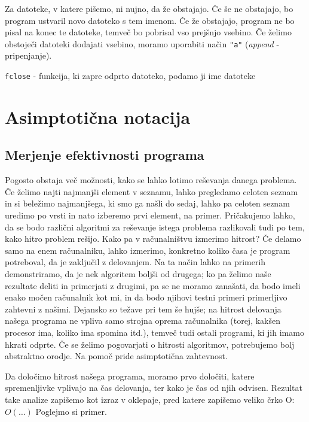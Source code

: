 \documentclass{book}
\begin{document}
Za datoteke, v katere pišemo, ni nujno, da že obstajajo. Če še ne obstajajo, bo
program ustvaril novo datoteko s tem imenom. Če že obstajajo, program ne bo
pisal na konec te datoteke, temveč bo pobrisal vso prejšnjo vsebino.
Če želimo obstoječi datoteki dodajati vsebino, moramo uporabiti način
\verb+"a"+ (\emph{append} - pripenjanje).

\verb+fclose+ - funkcija, ki zapre odprto datoteko, podamo ji ime datoteke

\chapter{Asimptotična notacija}

\section{Merjenje efektivnosti programa}

Pogosto obstaja več možnosti, kako se lahko lotimo reševanja danega problema.
Če želimo najti najmanjši element v seznamu, lahko pregledamo celoten seznam in
si beležimo najmanjšega, ki smo ga našli do sedaj, lahko pa celoten seznam
uredimo po vrsti in nato izberemo prvi element, na primer.
Pričakujemo lahko, da se bodo različni algoritmi za reševanje istega problema
razlikovali tudi po tem, kako hitro problem rešijo.
Kako pa v računalništvu izmerimo hitrost? Če delamo samo na enem računalniku,
lahko izmerimo, konkretno koliko časa je program potreboval, da je zaključil
z delovanjem. Na ta način lahko na primerih demonstriramo, da je nek algoritem
boljši od drugega; ko pa želimo naše rezultate deliti in primerjati z drugimi,
pa se ne moramo zanašati, da bodo imeli enako močen računalnik kot mi, in da
bodo njihovi testni primeri primerljivo zahtevni z našimi. Dejansko so težave
pri tem še hujše; na hitrost delovanja našega programa ne vpliva samo strojna
oprema računalnika (torej, kakšen procesor ima, koliko ima spomina itd.), temveč
tudi ostali programi, ki jih imamo hkrati odprte.
Če se želimo pogovarjati o hitrosti algoritmov, potrebujemo bolj abstraktno
orodje. Na pomoč pride asimptotična zahtevnost.

Da določimo hitrost našega programa, moramo prvo določiti, katere spremenljivke
vplivajo na čas delovanja, ter kako je čas od njih odvisen.
Rezultat take analize zapišemo kot izraz v oklepaje, pred katere zapišemo
veliko črko O: \(O(\ldots)\)
Poglejmo si primer.

\end{document}
